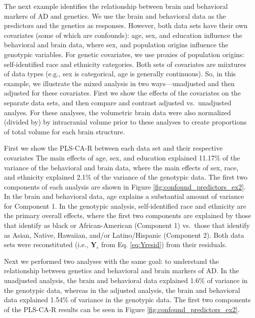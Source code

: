 \documentclass[12pt]{article}
\begin{document}
The next example identifies the relationship between brain and
behavioral markers of AD and genetics. We use the brain and behavioral
data as the predictors and the genetics as responses. However, both data
sets have their own covariates (some of which are confounds): age, sex,
and education influence the behavioral and brain data, where sex, and
population origins influence the genotypic variables. For genetic
covariates, we use proxies of population origins: self-identified race
and ethnicity categories. Both sets of covariates are miixtures of data
types (e.g., sex is categorical, age is generally continuous). So, in
this example, we illustrate the mixed analysis in two ways---unadjusted
and then adjusted for these covariates. First we show the effects of the
covariates on the separate data sets, and then compare and contrast
adjusted vs.~unadjusted analyes. For these analyses, the volumetric
brain data were also normalized (divided by) by intracranial volume
prior to these analyses to create proportions of total volume for each
brain structure.

First we show the PLS-CA-R between each data set and their respective
covariates The main effects of age, sex, and education explained 11.17\%
of the variance of the behavioral and brain data, where the main effects
of sex, race, and ethnicity explained 2.1\% of the variance of the
genotypic data. The first two components of each analysis are shown in
Figure \ref{fig:confound_predictors_ex2}. In the brain and behavioral
data, age explains a substantial amount of variance for Component 1. In
the genotypic analysis, self-identified race and ethnicity are the
primary overall effects, where the first two components are explained by
those that identify as black or African-American (Component 1) vs.~those
that identify as Asian, Native, Hawaiian, and/or Latino/Hispanic
(Component 2). Both data sets were reconstituted (i.e.,
\({\mathbf Y}_{\epsilon}\) from Eq. \ref{eq:Yresid}) from their
residuals.

Next we performed two analyses with the same goal: to understand the
relationship between genetics and behavioral and brain markers of AD. In
the unadjusted analysis, the brain and behavioral data explained 1.6\%
of variance in the genotypic data, whereas in the adjusted analysis, the
brain and behavioral data explained 1.54\% of variance in the genotypic
data. The first two components of the PLS-CA-R results can be seen in
Figure \ref{fig:confound_predictors_ex2}.
\end{document}
